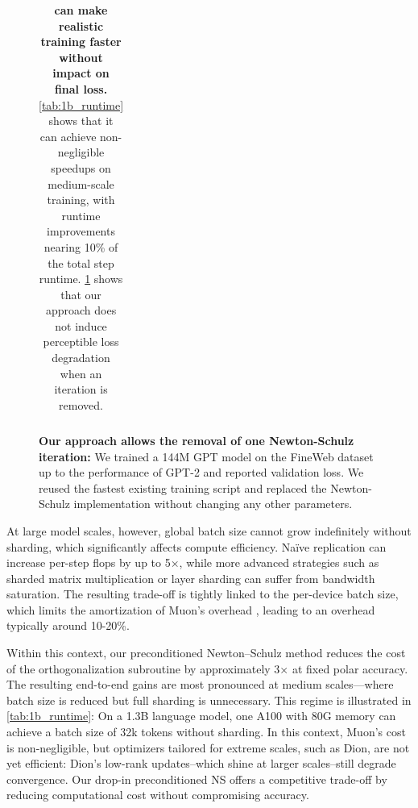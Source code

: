 \begin{table}[t]
\begin{subfigure}[b]{0.49\textwidth}
\begin{tabular}{p{1mm} lll}
        \bottomrule
        \end{tabular}
        \vspace{6mm}
        \caption{\textbf{Our approach allows the removal of one Newton-Schulz iteration:} We trained a 144M GPT model on the FineWeb dataset\cite{penedo2024fineweb} up to the performance of GPT-2 and reported validation loss. We reused the fastest existing training script and replaced the Newton-Schulz implementation without changing any other parameters. %
        }
        \label{tab:nanoGPT_accuracy}
        \vspace{3.5mm}
    \end{subfigure}
    \caption{\textbf{\turbomuon can make realistic training faster without impact on final loss.} \cref{tab:1b_runtime} shows that it can achieve non-negligible speedups on medium-scale training, with runtime improvements nearing 10\% of the total step runtime. \cref{tab:nanoGPT_accuracy} shows that our approach does not induce perceptible loss degradation when an iteration is removed.}
\fi
\end{table}

\begin{figure}[t]
    \centering
\end{figure}

At large model scales, however, global batch size cannot grow indefinitely without sharding, which significantly affects compute efficiency. Naïve replication can increase per-step flops by up to 5×, while more advanced strategies such as sharded matrix multiplication or layer sharding can suffer from bandwidth saturation. The resulting trade-off is tightly linked to the per-device batch size, which limits the amortization of Muon’s overhead \cite{essential2025muon}, leading to an overhead typically around 10-20\%.

Within this context, our preconditioned Newton–Schulz method reduces the cost of the orthogonalization subroutine by approximately 3× at fixed polar accuracy. The resulting end-to-end gains are most pronounced at medium scales—where batch size is reduced but full sharding is unnecessary. This regime is illustrated in \cref{tab:1b_runtime}: On a 1.3B language model, one A100 with 80G memory can achieve a batch size of 32k tokens without sharding. In this context, Muon’s cost is non-negligible, but optimizers tailored for extreme scales, such as Dion\cite{ahn_dion_2025}, are not yet efficient: Dion's low-rank updates--which shine at larger scales--still degrade convergence. Our drop-in preconditioned NS offers a competitive trade-off by reducing computational cost without compromising accuracy.


